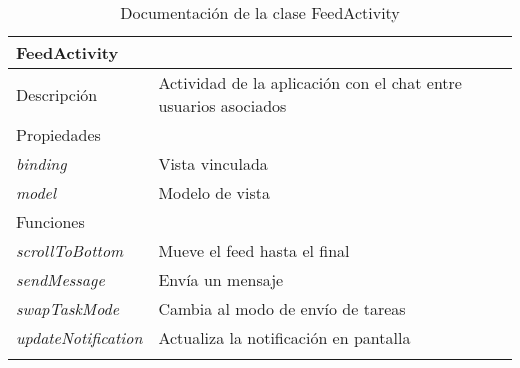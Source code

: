 \begin{longtable}{|p{} p{}|}
    \hline
    \multicolumn{2}{|l|}{\textbf{FeedActivity}} \\ \hline \hline
    Descripción      & Actividad de la aplicación con el chat entre usuarios asociados \\ \hline
    \multicolumn{2}{|l|}{Propiedades} \\
    \emph{binding}  & Vista vinculada  \\
    \emph{model}  & Modelo de vista  \\ \hline
    \multicolumn{2}{|l|}{Funciones} \\
    \emph{scrollToBottom}  & Mueve el feed hasta el final \\
    \emph{sendMessage}  & Envía un mensaje  \\ 
    \emph{swapTaskMode}  & Cambia al modo de envío de tareas  \\ 
    \emph{updateNotification}  & Actualiza la notificación en pantalla  \\  \hline
    \caption{Documentación de la clase FeedActivity}
    \label{dis:app:feed_activity}
\end{longtable}

